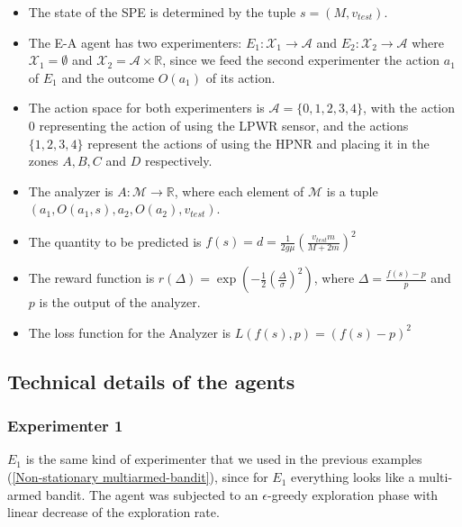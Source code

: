 \documentclass[11pt,a4paper,twoside]{report}
\newcommand{\+}{\textnormal{+} }
\theoremstyle{definition}
\numberwithin{equation}{chapter}
\begin{document}
\begin{itemize}
  \item The state of the SPE is determined by the tuple $s=(M,v_{test})$.
  \item The E-A agent has two experimenters: $E_1:\mathcal{X}_1
  \rightarrow\mathcal{A}$ and $E_2:\mathcal{X}_2 \rightarrow\mathcal{A}$ where
  $\mathcal{X}_1=\emptyset$ and $\mathcal{X}_2=\mathcal{A}\times \mathbb{R}$,
  since we feed the second experimenter the action $a_1$ of $E_1$ and the
  outcome $O(a_1)$ of its action.
  \item The action space for both experimenters is $\mathcal{A}=\{0,1,2,3,4\}$, 
  with the action $0$ representing the action of using the LPWR sensor, and
  the actions $\{1,2,3,4\}$ represent the actions of using the HPNR and placing 
  it in the zones $A, B, C$ and $D$ respectively.
  \item The analyzer is $A:\mathcal{M}\rightarrow \mathbb{R}$, where each element
  of $\mathcal{M}$ is a tuple \\
  $\left(a_1,O(a_1,s),a_2,O(a_2),v_{test}\right)$.
  \item The quantity to be predicted is
  $f(s)=d=\frac{1}{2g\mu}\left(\frac{v_{test}m}{M+2m} \right)^2$
  \item The reward function is 
  $r(\Delta)=\exp\left(-\frac{1}{2}\left( \frac{\Delta}{\sigma} \right)
  ^2\right)$, where $\Delta = \frac{f(s)-p}{p}$ and $p$ is the output of the
  analyzer.
  \item The loss function for the Analyzer is $L(f(s),p)=(f(s)-p)^2$
\end{itemize}

\subsection{Technical details of the agents}
\subsubsection{Experimenter 1}
$E_1$ is the same kind of experimenter that we used in the previous examples
(\ref{Non-stationary multiarmed-bandit}), since for $E_1$ everything looks like
a multi-armed bandit. The agent was subjected to an $\epsilon$-greedy 
exploration phase with linear decrease of the exploration rate.
\end{document}
